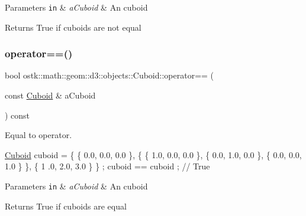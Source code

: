 \begin{DoxyParams}[1]{Parameters}
\mbox{\tt in}  & {\em a\+Cuboid} & An cuboid \\
\hline
\end{DoxyParams}
\begin{DoxyReturn}{Returns}
True if cuboids are not equal 
\end{DoxyReturn}
\mbox{\label{classostk_1_1math_1_1geom_1_1d3_1_1objects_1_1_cuboid_aeb4eab71c3019aef0ad4e561bcf20f06}} 
\subsubsection{\texorpdfstring{operator==()}{operator==()}}
{\footnotesize\ttfamily bool ostk\+::math\+::geom\+::d3\+::objects\+::\+Cuboid\+::operator== (\begin{DoxyParamCaption}\item[{const \hyperlink{classostk_1_1math_1_1geom_1_1d3_1_1objects_1_1_cuboid}{Cuboid} \&}]{a\+Cuboid }\end{DoxyParamCaption}) const}



Equal to operator. 


\begin{DoxyCode}
\hyperlink{classostk_1_1math_1_1geom_1_1d3_1_1objects_1_1_cuboid_a1da071d7cbb0a694348628f098f77c5b}{Cuboid} cuboid = \{ \{ 0.0, 0.0, 0.0 \}, \{ \{ 1.0, 0.0, 0.0 \}, \{ 0.0, 1.0, 0.0 \}, \{ 0.0, 0.0, 1.0 \} \}, \{ 1
      .0, 2.0, 3.0 \} \} ;
cuboid == cuboid ; \textcolor{comment}{// True}
\end{DoxyCode}



\begin{DoxyParams}[1]{Parameters}
\mbox{\tt in}  & {\em a\+Cuboid} & An cuboid \\
\hline
\end{DoxyParams}
\begin{DoxyReturn}{Returns}
True if cuboids are equal 
\end{DoxyReturn}
\mbox{\label{classostk_1_1math_1_1geom_1_1d3_1_1objects_1_1_cuboid_a6ea70c4469116cc9f512e4c1a0e49016}} 
